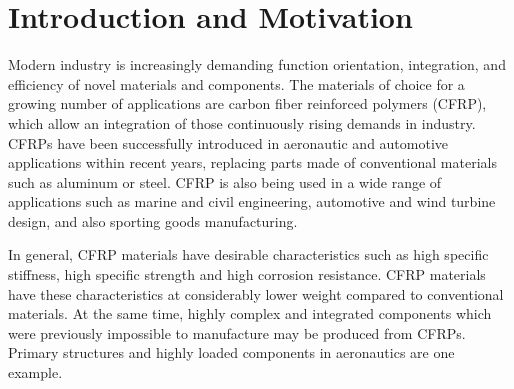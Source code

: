 


\section{Introduction and Motivation}
\label{sec:intro}
Modern industry is increasingly demanding function orientation, integration, and efficiency of novel materials and components. The materials of choice for a growing number of applications are carbon fiber reinforced polymers (CFRP), which allow an integration of those continuously rising demands in industry. CFRPs have been successfully introduced in aeronautic and automotive applications within recent years, replacing  parts made of conventional materials such as aluminum or steel. CFRP is also being used in a wide range of applications such as marine and civil engineering, automotive and wind turbine design, and also sporting goods manufacturing. 

In general, CFRP materials have desirable characteristics such as high specific stiffness, high specific strength and high corrosion resistance. CFRP materials have these characteristics  at considerably lower weight compared to conventional materials.
At the same time, highly complex and integrated components which were previously impossible to manufacture may be produced from CFRPs.
Primary structures and highly loaded components in aeronautics are one example.





